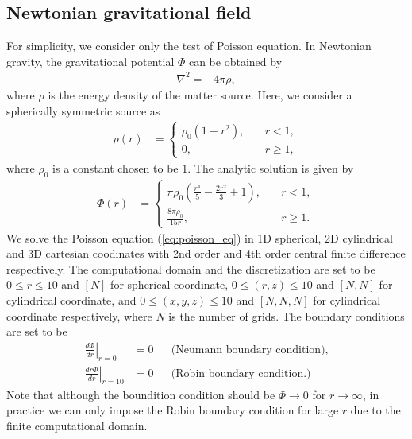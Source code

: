 \subsection{Newtonian gravitational field}
For simplicity, we consider only the test of Poisson equation.
In Newtonian gravity, the gravitational potential $\Phi$ can be obtained by
\begin{align}\label{eq:poisson_eq}
    \nabla^2 = - 4\pi \rho,
\end{align}
where $\rho$ is the energy density of the matter source.
Here, we consider a spherically symmetric source as
\begin{align}
    \rho(r) &= 
    \begin{cases}
        \rho_0 \left(1-r^2 \right), \quad & r<1,\\
        0, \quad & r\geq 1,
    \end{cases}
\end{align}
where $\rho_0$ is a constant chosen to be $1$.
The analytic solution is given by
\begin{align}
    \Phi(r) &=
    \begin{cases}
        \pi \rho_0 \left(\frac{r^4}{5} - \frac{2 r^2}{3} + 1 \right), \quad & r<1, \\
        \frac{8 \pi \rho_0}{15 r}, \quad & r\geq 1.
    \end{cases}
\end{align}
We solve the Poisson equation (\ref{eq:poisson_eq}) 
in 1D spherical, 2D cylindrical and 3D cartesian coodinates
with 2nd order and 4th order central finite difference respectively.
The computational domain and the discretization are set to be
$0\leq r \leq 10$ and $[N]$ for spherical coordinate,
$0\leq (r,z) \leq 10$ and $[N,N]$ for cylindrical coordinate, and
$0\leq (x,y,z) \leq 10$ and $[N,N,N]$ for cylindrical coordinate respectively,
where $N$ is the number of grids.
The boundary conditions are set to be
\begin{align}
    \left. \frac{d \Phi}{d r} \right|_{r=0} &= 0 && \text{(Neumann boundary condition)}, \\
    \left. \frac{d r\Phi}{dr} \right|_{r=10} &= 0 && \text{(Robin boundary condition.)}
\end{align}
Note that although the boundition condition should be $\Phi \rightarrow 0$ for $r \rightarrow \infty$,
in practice we can only impose the Robin boundary condition for large $r$ due to the finite computational domain.

